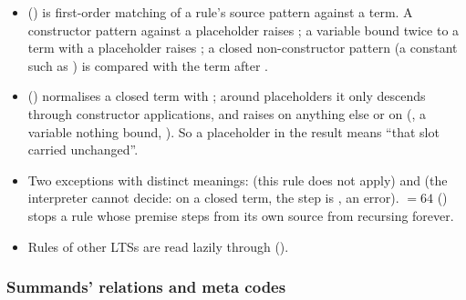 \begin{itemize}
\item {} () is first-order
  matching of a rule's source pattern against a term. A constructor
  pattern against a placeholder raises ; a variable bound twice
  to a term with a placeholder raises ; a closed non-constructor
  pattern (a constant such as ) is compared with the term
  after .
\item {} () normalises a
  closed term with ; around placeholders it only descends
  through constructor applications, and raises  on anything
  else or on  (, a variable nothing
  bound, ). So a placeholder in the result
  means ``that slot carried unchanged''.
\item Two exceptions with distinct meanings:  (this rule
  does not apply) and  (the interpreter cannot decide: on a
  closed term, the step is , an error).  $= 64$ () stops a
  rule whose premise steps from its own source from recursing forever.
\item Rules of other LTSs are read lazily through 
  ().
\end{itemize}



\subsubsection{Summands' relations and meta codes}

